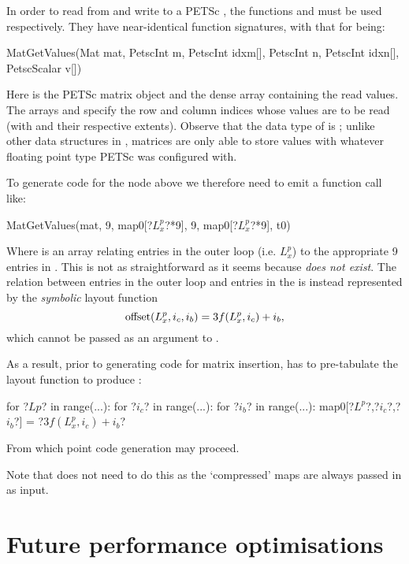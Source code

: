 \documentclass[thesis]{subfiles}
\begin{document}
In order to read from and write to a PETSc , the functions  and  must be used respectively.
They have near-identical function signatures, with that for  being:
\begin{cinline}
  MatGetValues(Mat mat,
               PetscInt m, PetscInt idxm[],
               PetscInt n, PetscInt idxn[],
               PetscScalar v[])
\end{cinline}
Here  is the PETSc matrix object and  the dense array containing the read values.
The arrays  and  specify the row and column indices whose values are to be read (with  and  their respective extents).
Observe that the data type of  is ; unlike other data structures in , matrices are only able to store values with whatever floating point type PETSc was configured with.

To generate code for the  node above we therefore need to emit a function call like:
\begin{cinline}
  MatGetValues(mat, 9, map0[?$L^p_x$?*9], 9, map0[?$L^p_x$?*9], t0)
\end{cinline}
Where  is an array relating entries in the outer loop (i.e. $L^p_x$) to the appropriate 9 entries in .
This is not as straightforward as it seems because  \emph{does not exist}.
The relation between entries in the outer loop and entries in the  is instead represented by the \emph{symbolic} layout function
\begin{equation*}
  \textnormal{offset}(L^p_x,i_c,i_b) = 3 f(L^p_x,i_c) + i_b,
\end{equation*}
which cannot be passed as an argument to .

As a result, prior to generating code for matrix insertion,  has to pre-tabulate the layout function to produce :
\begin{pyinline}
  for ?$Lp$? in range(...):
    for ?$i_c$? in range(...):
      for ?$i_b$? in range(...):
        map0[?$L^p$?,?$i_c$?,?$i_b$?] = ?$3 f(L^p_x,i_c) + i_b$?
\end{pyinline}
From which point code generation may proceed.

Note that  does not need to do this as the `compressed' maps are always passed in as input.

\section{Future performance optimisations}
\label{sec:codegen_optimisation}
\end{document}

